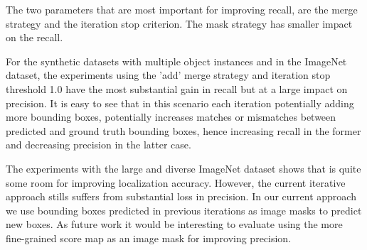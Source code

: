 The two parameters that are most important for improving recall, are the merge strategy and the iteration stop criterion. The mask strategy has smaller impact on the recall. 

For the synthetic datasets with multiple object instances and in the ImageNet dataset, the experiments using the 'add' merge strategy and iteration stop threshold 1.0 have the most substantial gain in recall but at a large impact on precision. It is easy to see that in this scenario each iteration potentially adding more bounding boxes, potentially increases matches  or mismatches between predicted and ground truth bounding boxes, hence increasing recall in the former and decreasing precision in the latter case.

The experiments with the large and diverse ImageNet dataset shows that is quite some room for improving localization accuracy. However, the current iterative approach stills suffers from substantial loss in precision. In our current approach we use bounding boxes predicted in previous iterations as image masks to predict new boxes. As future work it would be interesting to evaluate using the more fine-grained score map as an image mask for improving precision.